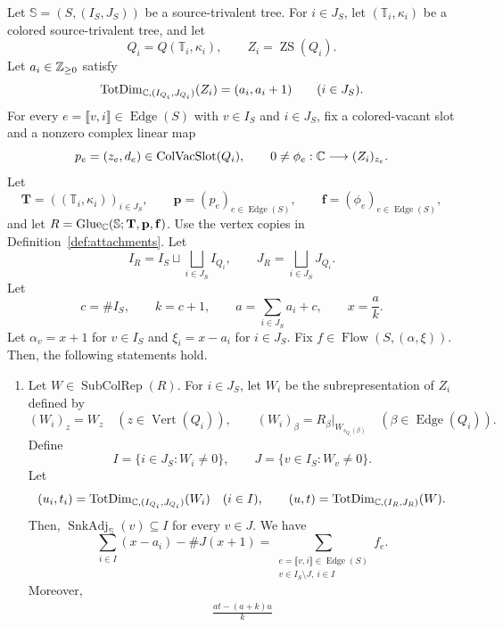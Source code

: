 \begin{lemma}\label{lem:gluing-subrepresentation-weights}
Let $\mathbb S=(S,(I_S,J_S))$ be a source-trivalent tree.
For $i\in J_S$, let $(\mathbb T_i,\kappa_i)$ be a colored source-trivalent tree, and let
\[
 Q_i=Q(\mathbb T_i,\kappa_i),\qquad Z_i=\operatorname{ZS}(Q_i).
\]
Let $a_i\in\mathbb Z_{\ge0}$ satisfy
\[
 \operatorname{TotDim}_{\mathbb C,(I_{Q_i},J_{Q_i})}(Z_i)=(a_i,a_i+1)
 \qquad(i\in J_S).
\]
For every $e=\llbracket v,i\rrbracket\in\operatorname{Edge}(S)$ with
$v\in I_S$ and $i\in J_S$, fix a colored-vacant slot and a nonzero complex linear map
\[
 p_e=(z_e,d_e)\in\operatorname{ColVacSlot}(Q_i),\qquad
 0\ne\phi_e:\mathbb C\longrightarrow(Z_i)_{z_e}.
\]
Let
\[
 \mathbf T=((\mathbb T_i,\kappa_i))_{i\in J_S},\qquad
 \mathbf p=(p_e)_{e\in\operatorname{Edge}(S)},\qquad
 \mathbf f=(\phi_e)_{e\in\operatorname{Edge}(S)},
\]
and let $R=\operatorname{Glue}_\mathbb C(\mathbb S;\mathbf T,\mathbf p,\mathbf f)$.
Use the vertex copies in Definition~\ref{def:attachments}. Let
\[
 I_R=I_S\sqcup\bigsqcup_{i\in J_S}I_{Q_i},\qquad
 J_R=\bigsqcup_{i\in J_S}J_{Q_i}.
\]
Let
\[
 c=\#I_S,\qquad k=c+1,\qquad
 a=\sum_{i\in J_S}a_i+c,\qquad x=\frac ak.
\]
Let $\alpha_v=x+1$ for $v\in I_S$ and $\xi_i=x-a_i$ for $i\in J_S$.
Fix $f\in\operatorname{Flow}(S,(\alpha,\xi))$.
Then, the following statements hold.
\begin{enumerate}
\item\label{c:gluing-weight-decomposition} Let $W\in\operatorname{SubColRep}(R)$.
For $i\in J_S$, let $W_i$ be the subrepresentation of $Z_i$ defined by
\[
 (W_i)_z=W_z\quad(z\in\operatorname{Vert}(Q_i)),\qquad
 (W_i)_\beta=R_\beta|_{W_{s_{Q_i}(\beta)}}
 \quad(\beta\in\operatorname{Edge}(Q_i)).
\]
Define
\[
 I=\{i\in J_S:W_i\ne0\},\qquad
 J=\{v\in I_S:W_v\ne0\}.
\]
Let
\[
 (u_i,t_i)=\operatorname{TotDim}_{\mathbb C,(I_{Q_i},J_{Q_i})}(W_i)
 \quad(i\in I),\qquad
 (u,t)=\operatorname{TotDim}_{\mathbb C,(I_R,J_R)}(W).
\]
Then, $\operatorname{SnkAdj}_{\mathbb S}(v)\subseteq I$ for every $v\in J$. We have
\begin{equation}\label{eq:gluing-boundary-flow}
 \sum_{i\in I}(x-a_i)-\#J(x+1)
 =
 \sum_{\substack{e=\llbracket v,i\rrbracket\in\operatorname{Edge}(S)\\
                  v\in I_S\setminus J,\ i\in I}}f_e.
\end{equation}
Moreover,
\begin{equation}\label{eq:gluing-subobject-weight}
\begin{aligned}
 \frac{at-(a+k)u}{k}

\end{aligned}
\end{equation}
\end{enumerate}
\end{lemma}
